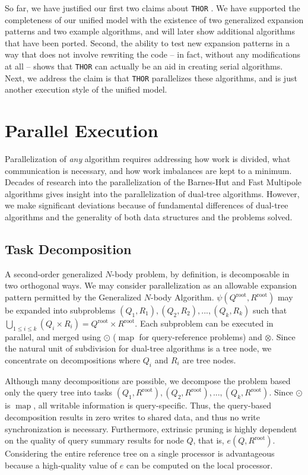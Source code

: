 \documentclass[twoside,leqno,twocolumn]{article}
\newcommand{\THOR}{{{\tt THOR}} }
\newcommand{\Union}{\bigcup}
\DeclareMathOperator*{\map}{map}
\newcommand{\gnp}{\psi}
\newcommand{\kdroot}[1]{#1^{\text{root}}}
\newcommand{\lettermu}{e}
\newcommand{\inmu}{e}
\begin{document}
So far, we have justified our first two claims about \THOR.
We have supported the completeness of our unified model with the existence of two generalized expansion patterns and two example algorithms, and will later show additional algorithms that have been ported.
Second, the ability to test new expansion patterns in a way that does not involve rewriting the code -- in fact, without any modifications at all -- shows that \THOR can actually be an aid in creating serial algorithms.
Next, we address the claim is that \THOR parallelizes these algorithms, and is just another execution style of the unified model.

\section{Parallel Execution}

Parallelization of {\em any} algorithm requires addressing how work is divided, what communication is necessary, and how work imbalances are kept to a minimum.
Decades of research into the parallelization of the Barnes-Hut and Fast Multipole algorithms gives insight into the parallelization of dual-tree algorithms.
However, we make significant deviations because of fundamental differences of dual-tree algorithms and the generality of both data structures and the problems solved.

\subsection{Task Decomposition}

A second-order generalized $N$-body problem, by definition, is decomposable in two orthogonal ways.
We may consider parallelization as an allowable expansion pattern permitted by the Generalized $N$-body Algorithm.
$\gnp(\kdroot{Q}, \kdroot{R})$ may be expanded into subproblems $(Q_1,R_1), (Q_2,R_2), ..., (Q_k, R_k)$ such that $\Union_{1 \leq i \leq k} (Q_i \times R_i) = \kdroot{Q} \times \kdroot{R}$.
Each subproblem can be executed in parallel, and merged using $\odot$ ($\map$ for query-reference problems) and $\otimes$.
Since the natural unit of subdivision for dual-tree algorithms is a tree node, we concentrate on decompositions where $Q_i$ and $R_i$ are tree nodes.

Although many decompositions are possible, we decompose the problem based only the query tree into tasks $(Q_1, \kdroot{R}), (Q_2, \kdroot{R}), ..., (Q_k, \kdroot{R})$.
Since $\odot$ is $\map$, all writable information is query-specific.
Thus, the query-based decomposition results in zero writes to shared data, and thus no write synchronization is necessary.
Furthermore, extrinsic pruning is highly dependent on the quality of query summary results for node $Q$, that is, $\inmu(Q, \kdroot{R})$.
Considering the entire reference tree on a single processor is advantageous because a high-quality value of $\lettermu$ can be computed on the local processor.
\end{document}

